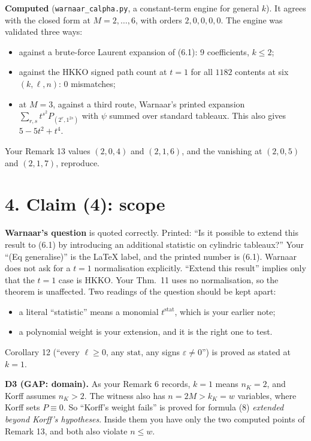 \documentclass[10pt]{article}
\begin{document}
\textbf{Computed} (\texttt{warnaar\_calpha.py}, a constant-term engine for general $k$). It agrees with the closed
form at $M=2,\dots,6$, with orders $2,0,0,0,0$. The engine was validated three ways:
\begin{itemize}
\item against a brute-force Laurent expansion of (6.1): 9 coefficients, $k\le2$;
\item against the HKKO signed path count at $t=1$ for all $1182$ contents at six $(k,\ell,n)$: 0 mismatches;
\item at $M=3$, against a third route, Warnaar's printed expansion $\sum_{r,s}t^{s^2}P_{(2^r,1^{2s})}$ with $\psi$ summed over standard tableaux. This also gives $5-5t^2+t^4$.
\end{itemize}
Your Remark 13 values $(2,0,4)$ and $(2,1,6)$, and the vanishing at $(2,0,5)$ and $(2,1,7)$, reproduce.

\section*{4. Claim (4): scope}
\textbf{Warnaar's question} is quoted correctly. Printed: ``Is it possible to extend this result to (6.1) by
introducing an additional statistic on cylindric tableaux?'' Your ``(Eq generalise)'' is the \LaTeX{} label, and
the printed number is (6.1). Warnaar does not ask for a $t=1$ normalisation explicitly. ``Extend this result'' implies
only that the $t=1$ case is HKKO. Your Thm.~11 uses no normalisation, so the theorem is unaffected. Two readings of
the question should be kept apart:
\begin{itemize}
\item a literal ``statistic'' means a monomial $t^{\mathrm{stat}}$, which is your earlier note;
\item a polynomial weight is your extension, and it is the right one to test.
\end{itemize}
Corollary 12 (``every $\ell\ge0$, any $\mathrm{stat}$, any signs $\varepsilon\ne0$'') is proved as stated at $k=1$.

\textbf{D3 (GAP: domain).} As your Remark 6 records, $k=1$ means $n_K=2$, and Korff assumes $n_K>2$. The witness
also has $n=2M>k_K=w$ variables, where Korff sets $P\equiv0$. So ``Korff's weight fails'' is proved for formula (8)
\emph{extended beyond Korff's hypotheses}. Inside them you have only the two computed points of Remark 13, and both
also violate $n\le w$.
\end{document}
